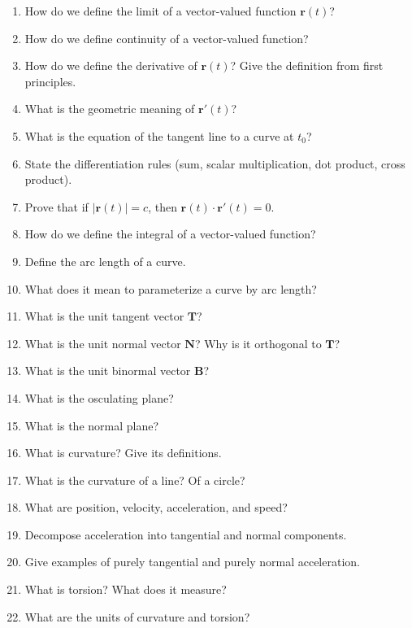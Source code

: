 \begin{enumerate}

\item How do we define the limit of a vector-valued function $\mathbf{r}(t)$?

\item How do we define continuity of a vector-valued function?

\item How do we define the derivative of $\mathbf{r}(t)$? Give the definition from first principles.

\item What is the geometric meaning of $\mathbf{r}'(t)$?

\item What is the equation of the tangent line to a curve at $t_0$?

\item State the differentiation rules (sum, scalar multiplication, dot product, cross product).

\item Prove that if $|\mathbf{r}(t)| = c$, then $\mathbf{r}(t) \cdot \mathbf{r}'(t) = 0$.

\item How do we define the integral of a vector-valued function?

\item Define the arc length of a curve.

\item What does it mean to parameterize a curve by arc length?

\item What is the unit tangent vector $\mathbf{T}$?

\item What is the unit normal vector $\mathbf{N}$? Why is it orthogonal to $\mathbf{T}$?

\item What is the unit binormal vector $\mathbf{B}$?

\item What is the osculating plane?

\item What is the normal plane?

\item What is curvature? Give its definitions.

\item What is the curvature of a line? Of a circle?

\item What are position, velocity, acceleration, and speed?

\item Decompose acceleration into tangential and normal components.

\item Give examples of purely tangential and purely normal acceleration.

\item What is torsion? What does it measure?

\item What are the units of curvature and torsion?

\end{enumerate}

